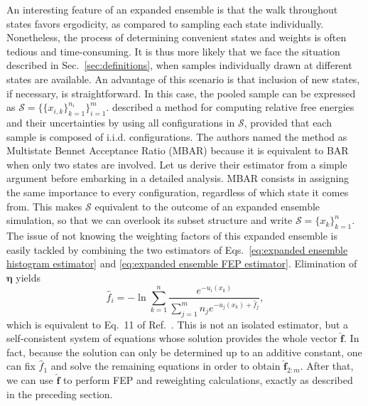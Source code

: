 \documentclass[journal=jctcce,manuscript=article]{achemso}
\newcommand{\vt}[1]{\boldsymbol{\mathbf{#1}}}   %
\begin{document}
An interesting feature of an expanded ensemble is that the walk throughout states favors ergodicity, as compared to sampling each state individually. Nonetheless, the process of determining convenient states and weights is often tedious and time-consuming. It is thus more likely that we face the situation described in Sec.~\ref{sec:definitions}, when samples individually drawn at different states are available. An advantage of this scenario is that inclusion of new states, if necessary, is straightforward. In this case, the pooled sample can be expressed as $\mathcal S = \big\{\{x_{i,k}\}_{k=1}^{n_i} \big\}_{i=1}^m$. \citeauthor{Shirts_2008} \cite{Shirts_2008} described a method for computing relative free energies and their uncertainties by using all configurations in $\mathcal S$, provided that each sample is composed of i.i.d. configurations. The authors named the method as Multistate Bennet Acceptance Ratio (MBAR) because it is equivalent to BAR when only two states are involved. Let us derive their estimator from a simple argument before embarking in a detailed analysis. MBAR consists in assigning the same importance to every configuration, regardless of which state it comes from. This makes $\mathcal S$ equivalent to the outcome of an expanded ensemble simulation, so that we can overlook its subset structure and write $\mathcal S = \{x_k\}_{k=1}^n$. The issue of not knowing the weighting factors of this expanded ensemble is easily tackled by combining the two estimators of Eqs.~\eqref{eq:expanded ensemble histogram estimator} and \eqref{eq:expanded ensemble FEP estimator}. Elimination of $\vt \eta$ yields
\begin{equation}
\label{eq:mbar free energy estimator}
\hat f_i = -\ln \sum_{k=1}^n \frac{e^{-u_i(x_k)}}{\sum_{j=1}^m n_j e^{-u_j(x_k) + \hat f_j}},
\end{equation}
which is equivalent to Eq.~11 of Ref.~. This is not an isolated estimator, but a self-consistent system of equations whose solution provides the whole vector $\hat {\vt f}$. In fact, because the solution can only be determined up to an additive constant, one can fix $\hat f_1$ and solve the remaining equations in order to obtain $\hat{\vt f}_{2:m}$. After that, we can use $\hat{\vt f}$ to perform FEP and reweighting calculations, exactly as described in the preceding section.
\end{document}
